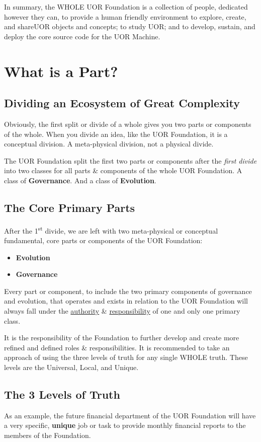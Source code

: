 \documentclass[twocolumn,10pt]{article}
\begin{document}
In summary, the WHOLE UOR Foundation is a collection of people, dedicated however they can, to provide a human friendly environment to explore, create, and share\@ UOR objects and concepts; to study UOR\@; and to develop, sustain, and deploy the core source code for the UOR Machine\@.

\section*{What is a Part?}
\subsection*{Dividing an Ecosystem of Great Complexity}
Obviously, the first split or divide of a whole gives you two parts or components of the whole.
When you divide an idea, like the UOR Foundation, it is a conceptual division.
A meta-physical division, not a physical divide.

The UOR Foundation split the first two parts or components after the \textit{first divide} into two classes for all parts \& components of the whole UOR Foundation.
A class of \textbf{Governance}.
And a class of \textbf{Evolution}.

\subsection*{The Core Primary Parts}
After the 1\textsuperscript{st} divide, we are left with two meta-physical or conceptual fundamental, core parts or components of the UOR Foundation:
    \begin{itemize}
        \item \textbf{Evolution} 
        \item \textbf{Governance}
    \end{itemize}

Every part or component, to include the two primary components of governance and evolution, that operates and exists in relation to the UOR Foundation will always fall under the \underline{authority} \& \underline{responsibility} of one and only one primary class.

It is the responsibility of the Foundation to further develop and create more refined and defined roles \& responsibilities.
It is recommended to take an approach of using the three levels of truth for any single WHOLE truth.
These levels are the Universal, Local, and Unique.

\subsection*{The 3 Levels of Truth}
As an example, the future financial department of the UOR Foundation will have a very specific, \textbf{unique} job or task to provide monthly financial reports to the members of the Foundation.
\end{document}
